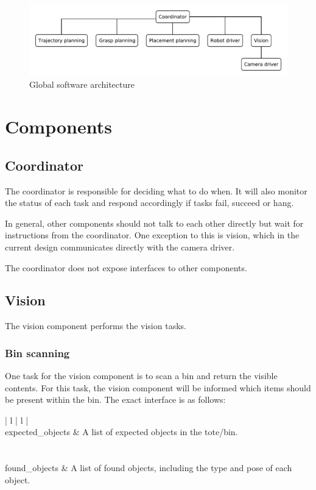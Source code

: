 \documentclass[a4paper]{article}
\begin{document}
\begin{figure}[hbtp]
	\includegraphics[width=\textwidth]{figures/global-architecture}
\caption{Global software architecture}
\label{fig:global-architecture}
\end{figure}


\section{Components}

\subsection{Coordinator}
The coordinator is responsible for deciding what to do when.
It will also monitor the status of each task and respond accordingly if tasks fail, succeed or hang.

In general, other components should not talk to each other directly but wait for instructions from the coordinator.
One exception to this is vision, which in the current design communicates directly with the camera driver.

The coordinator does not expose interfaces to other components.


\subsection{Vision}
The vision component performs the vision tasks.

\subsubsection*{Bin scanning}
One task for the vision component is to scan a bin and return the visible contents.
For this task, the vision component will be informed which items should be present within the bin.
The exact interface is as follows:

\begin{tabular}{| l | l |}
\hline
{} \\
\hline
expected\_objects & A list of expected objects in the tote/bin. \\
\hline
{} \\
\hline
{} \\
\hline
found\_objects  & A list of found objects, including the type and pose of each object. \\
\hline
\end{tabular}
\end{document}
